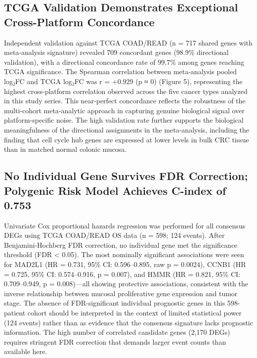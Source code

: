 \documentclass[
  12pt,
]{article}
\begin{document}
\subsection{TCGA Validation Demonstrates Exceptional Cross-Platform
Concordance}\label{tcga-validation-demonstrates-exceptional-cross-platform-concordance}

Independent validation against TCGA COAD/READ (n = 717 shared genes with
meta-analysis signature) revealed 709 concordant genes (98.9\%
directional validation), with a directional concordance rate of 99.7\%
among genes reaching TCGA significance. The Spearman correlation between
meta-analysis pooled log₂FC and TCGA log₂FC was r = +0.929 (p ≈ 0)
(Figure 5), representing the highest cross-platform correlation observed
across the five cancer types analyzed in this study series. This
near-perfect concordance reflects the robustness of the multi-cohort
meta-analytic approach in capturing genuine biological signal over
platform-specific noise. The high validation rate further supports the
biological meaningfulness of the directional assignments in the
meta-analysis, including the finding that cell cycle hub genes are
expressed at lower levels in bulk CRC tissue than in matched normal
colonic mucosa.

\subsection{No Individual Gene Survives FDR Correction; Polygenic Risk
Model Achieves C-index of
0.753}\label{no-individual-gene-survives-fdr-correction-polygenic-risk-model-achieves-c-index-of-0.753}

Univariate Cox proportional hazards regression was performed for all
consensus DEGs using TCGA COAD/READ OS data (n = 598; 124 events). After
Benjamini-Hochberg FDR correction, no individual gene met the
significance threshold (FDR \textless{} 0.05). The most nominally
significant associations were seen for MAD2L1 (HR = 0.731, 95\% CI:
0.596--0.895, raw p = 0.0024), CCNB1 (HR = 0.725, 95\% CI: 0.574--0.916,
p = 0.007), and HMMR (HR = 0.821, 95\% CI: 0.709--0.949, p =
0.008)---all showing protective associations, consistent with the
inverse relationship between mucosal proliferative gene expression and
tumor stage. The absence of FDR-significant individual prognostic genes
in this 598-patient cohort should be interpreted in the context of
limited statistical power (124 events) rather than as evidence that the
consensus signature lacks prognostic information. The high number of
correlated candidate genes (2,170 DEGs) requires stringent FDR
correction that demands larger event counts than available here.
\end{document}
